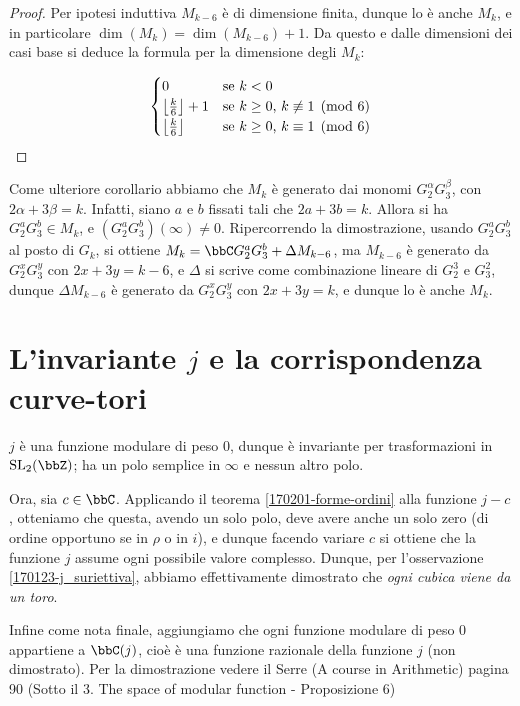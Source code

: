\begin{proof}
	Per ipotesi induttiva $M_{k-6}$ è di dimensione finita, dunque lo è anche $M_k$, e in particolare $\dim(M_k)=\dim(M_{k-6})+1$.
	Da questo e dalle dimensioni dei casi base si deduce la formula per la dimensione degli $M_k$:
	
	\begin{equation*}
		\begin{cases}
			0 						&	\text{se $k<0$}\\
			\left\lfloor \frac{k}{6} \right\rfloor +1	&	\text{se $k\geq0$, $k\not\equiv1\pmod{6}$}\\
			\left\lfloor \frac{k}{6} \right\rfloor		&	\text{se $k\geq0$, $k\equiv1\pmod{6}$}
		\end{cases}
	\end{equation*}

\end{proof}

Come ulteriore corollario abbiamo che $M_k$ è generato dai monomi $G_2^\alpha G_3^\beta$, con $2\alpha+3\beta=k$.
Infatti, siano $a$ e $b$ fissati tali che $2a+3b=k$.
Allora si ha $G_2^a G_3^b\in M_k$, e $(G_2^a G_3^b)(\infty)\neq0$.
Ripercorrendo la dimostrazione, usando $G_2^a G_3^b$ al posto di $G_k$, si ottiene $M_k=\bbC G_2^a G_3^b + \Delta M_{k-6}$, ma $M_{k-6}$ è generato da $G_2^x G_3^y$ con $2x+3y=k-6$, e $\Delta$ si scrive come combinazione lineare di $G_2^3$ e $G_3^2$, dunque $\Delta M_{k-6}$ è generato da $G_2^x G_3^y$ con $2x+3y=k$, e dunque lo è anche $M_k$.


\section{L'invariante $j$ e la corrispondenza curve-tori}

$j$ è una funzione modulare di peso $0$, dunque è invariante per trasformazioni in $\SL_2(\bbZ)$; ha un polo semplice in $\infty$ e nessun altro polo.

Ora, sia $c \in \bbC$. Applicando il teorema \ref{170201-forme-ordini} alla funzione $j-c$, otteniamo che questa, avendo un solo polo, deve avere anche un solo zero (di ordine opportuno se in $\rho$ o in $i$), e dunque facendo variare $c$ si ottiene che la funzione $j$ assume ogni possibile valore complesso. Dunque, per l'osservazione \ref{170123-j_suriettiva}, abbiamo effettivamente dimostrato che \emph{ogni cubica viene da un toro}.

Infine come nota finale, aggiungiamo che ogni funzione modulare di peso $0$ appartiene a $\bbC(j)$, cioè è una funzione razionale della funzione $j$ (non dimostrato). Per la dimostrazione vedere il Serre (A course in Arithmetic) pagina 90 (Sotto il 3. The space of modular function - Proposizione 6)

